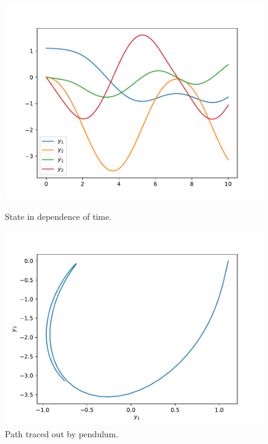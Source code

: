 \documentclass{scrartcl}
\begin{document}
\begin{figure}[h]
\centering
\begin{minipage}[b]{0.45\textwidth}
\centering
\includegraphics[width=\textwidth]{../Plots/Task4/Figure_1}
\caption{State in dependence of time.}
\label{pl:StateTime1}
\end{minipage}
\hfill
\begin{minipage}[b]{0.45\textwidth}
\centering
\includegraphics[width=\textwidth]{../Plots/Task4/Figure_2}
\caption{Path traced out by pendulum.}
\label{pl:PhasePortrait1}
\end{minipage}
\end{figure}
\end{document}
